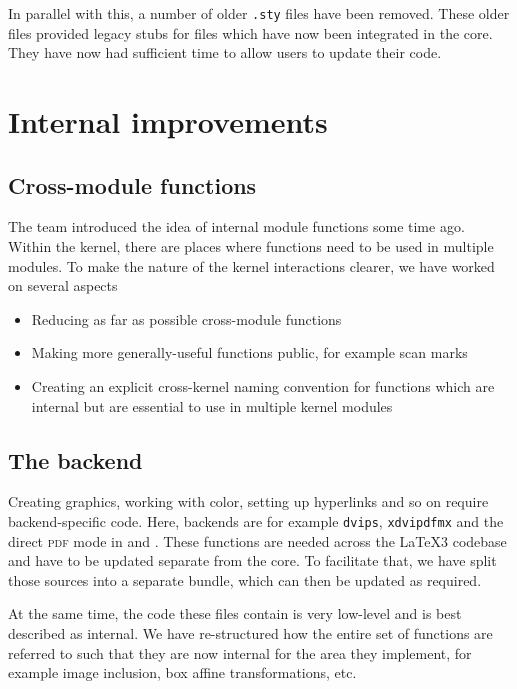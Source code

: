 \documentclass{ltnews}
\begin{document}
In parallel with this, a number of older \texttt{.sty} files have been removed.
These older files provided legacy stubs for files which have now been
integrated in the  core. They have now had sufficient time to allow
users to update their code.

\section{Internal improvements}

\subsection{Cross-module functions}

The team introduced the idea of internal module functions some time ago. Within
the kernel, there are places where functions need to be used in multiple
modules. To make the nature of the kernel interactions clearer, we have worked
on several aspects
\begin{itemize}
  \item Reducing as far as possible cross-module functions
  \item Making more generally-useful functions public, for example
    scan marks
  \item Creating an explicit cross-kernel naming convention for
    functions which are internal but are essential to use in multiple
    kernel modules
\end{itemize}

\subsection{The backend}

Creating graphics, working with color, setting up hyperlinks and so on require
backend-specific code. Here, backends are for example \texttt{dvips},
\texttt{xdvipdfmx} and the direct \textsc{pdf} mode in  and
. These functions are needed across the \LaTeX3 codebase and
have to be updated separate from the  core. To facilitate that, we
have split those sources into a separate bundle, which can then be updated as
required.

At the same time, the code these files contain is very low-level and is best
described as internal. We have re-structured how the entire set of functions
are referred to such that they are now internal for the area they implement,
for example image inclusion, box affine transformations, etc.
\end{document}
